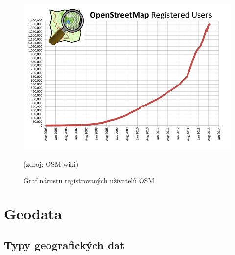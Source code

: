 \documentclass[11pt,a4paper,titlepage,oneside]{book}
\begin{document}
		\begin{figure}[!h]
			\begin{center}
				\includegraphics[width=12cm]{obrazky/osm_stat_users.png}
				\caption{Graf nárustu registrovaných uživatelů \ac{OSM}}
				 (zdroj: \ac{OSM} wiki\cite{osm_wiki_stats})
			\end{center}
		\end{figure}


	\section{Geodata}
		\subsection{Typy geografických dat}




\end{document}
